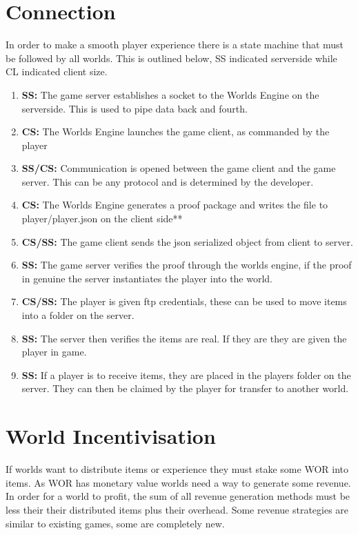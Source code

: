 \documentclass[runningheads,a4paper]{llncs}
\begin{document}
\section{Connection}
In order to make a smooth player experience there is a state machine that must be followed by all worlds. This is outlined below, SS indicated serverside while CL indicated client size.

\begin{enumerate}
\item{\textbf{SS:} The game server establishes a socket to the Worlds Engine on the serverside. This is used to pipe data back and fourth.}
\item{\textbf{CS:} The Worlds Engine launches the game client, as commanded by the player}
\item{\textbf{SS/CS:} Communication is opened between the game client and the game server. This can be any protocol and is determined by the developer.}
\item{\textbf{CS:} The Worlds Engine generates a proof package and writes the file to player/player.json on the client side**}
\item{\textbf{CS/SS:} The game client sends the json serialized object from client to server.}
\item{\textbf{SS:} The game server verifies the proof through the worlds engine, if the proof in genuine the server instantiates the player into the world.}
\item{\textbf{CS/SS:} The player is given ftp credentials, these can be used to move items into a folder on the server.}
\item{\textbf{SS:} The server then verifies the items are real. If they are they are given the player in game.}
\item{\textbf{SS:} If a player is to receive items, they are placed in the players folder on the server. They can then be claimed by the player for transfer to another world.}
\end{enumerate}


\section{World Incentivisation}
\label{MakeMoney}
If worlds want to distribute items or experience they must stake some WOR into items. As WOR has monetary value worlds need a way to generate some revenue. In order for a world to profit, the sum of all revenue generation methods must be less their their distributed items plus their overhead. Some revenue strategies are similar to existing games, some are completely new. 
\end{document}
